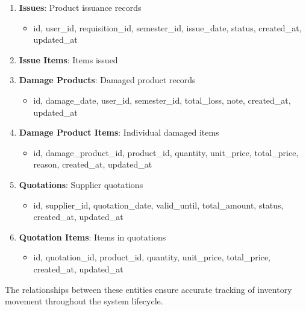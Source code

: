 \begin{enumerate}
    \item \textbf{Issues}: Product issuance records
    \begin{itemize}
        \item id, user\_id, requisition\_id, semester\_id, issue\_date, status, created\_at, updated\_at
    \end{itemize}

    \item \textbf{Issue Items}: Items issued
    \begin{itemize}
}
        \item id, issue\_id, product\_id, quantity, status, created\_at, updated\_at
    \end{itemize}

    \item \textbf{Damage Products}: Damaged product records
    \begin{itemize}
        \item id, damage\_date, user\_id, semester\_id, total\_loss, note, created\_at, updated\_at
    \end{itemize}

    \item \textbf{Damage Product Items}: Individual damaged items
    \begin{itemize}
        \item id, damage\_product\_id, product\_id, quantity, unit\_price, total\_price, reason, created\_at, updated\_at
    \end{itemize}

    \item \textbf{Quotations}: Supplier quotations
    \begin{itemize}
        \item id, supplier\_id, quotation\_date, valid\_until, total\_amount, status, created\_at, updated\_at
    \end{itemize}

    \item \textbf{Quotation Items}: Items in quotations
    \begin{itemize}
        \item id, quotation\_id, product\_id, quantity, unit\_price, total\_price, created\_at, updated\_at
    \end{itemize}
\end{enumerate}

The relationships between these entities ensure accurate tracking of inventory movement throughout the system lifecycle.

